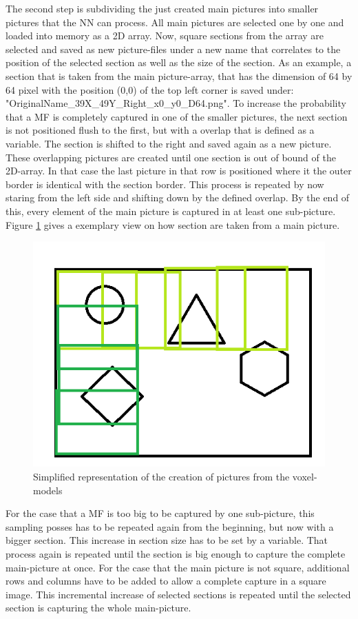 \documentclass[conference]{IEEEtran}
\begin{document}
The second step is subdividing the just created main pictures into smaller pictures that the NN can process. 
All main pictures are selected one by one and loaded into memory as a 2D array. Now, square sections from the array are selected and saved as new picture-files under a new name that correlates to the position of the selected section as well as the size of the section. As an example, a section that is taken from the main picture-array, that has the dimension of 64 by 64 pixel with the position (0,0) of the top left corner is saved under:  "OriginalName\_39X\_49Y\_Right\_x0\_y0\_D64.png". 
To increase the probability that a MF is completely captured in one of the smaller pictures, the next section is not positioned flush to the first, but with a overlap that is defined as a variable. 
The section is shifted to the right and saved again as a new picture.
These overlapping pictures are created until one section is out of bound of the 2D-array. In that case the last picture in that row is positioned where it the outer border is identical with the section border.
This process is repeated by now staring from the left side and shifting down by the defined overlap.
By the end of this, every element of the main picture is captured in at least one sub-picture.
Figure \ref{fig:Overlap} gives a exemplary view on how section are taken from a main picture.  
 
\begin{figure}[H]
	\begin{center}
		\includegraphics[width=0.7\linewidth]{pictures/overlap.png}
		\caption{Simplified representation of the creation of pictures from the voxel-models }
		\label{fig:Overlap}
	\end{center}
\end{figure} 
For the case that a MF is too big to be captured by one sub-picture, this sampling posses has to be repeated again from the beginning, but now with a bigger section. This increase in section size has to be set by a variable. That process again is repeated until the section is big enough to capture the complete main-picture at once. For the case that the main picture is not square, additional rows and columns have to be added to allow a complete capture in a square image. This incremental increase of selected sections is repeated until the selected section is capturing the whole main-picture.
\end{document}
